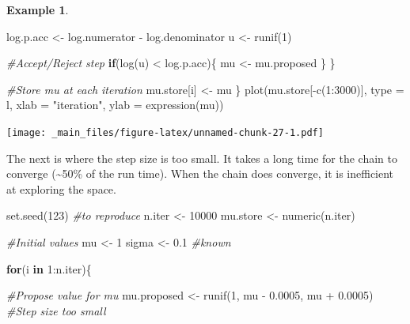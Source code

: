 \documentclass[
]{book}
\newenvironment{Shaded}{\begin{snugshade}}{\end{snugshade}}
\newcommand{\AttributeTok}[1]{\textcolor[rgb]{0.77,0.63,0.00}{#1}}
\newcommand{\CommentTok}[1]{\textcolor[rgb]{0.56,0.35,0.01}{\textit{#1}}}
\newcommand{\ControlFlowTok}[1]{\textcolor[rgb]{0.13,0.29,0.53}{\textbf{#1}}}
\newcommand{\DecValTok}[1]{\textcolor[rgb]{0.00,0.00,0.81}{#1}}
\newcommand{\FloatTok}[1]{\textcolor[rgb]{0.00,0.00,0.81}{#1}}
\newcommand{\FunctionTok}[1]{\textcolor[rgb]{0.00,0.00,0.00}{#1}}
\newcommand{\NormalTok}[1]{#1}
\newcommand{\OtherTok}[1]{\textcolor[rgb]{0.56,0.35,0.01}{#1}}
\newcommand{\SpecialCharTok}[1]{\textcolor[rgb]{0.00,0.00,0.00}{#1}}
\newcommand{\StringTok}[1]{\textcolor[rgb]{0.31,0.60,0.02}{#1}}
\theoremstyle{definition}
\theoremstyle{definition}
\newtheorem{example}{Example}[chapter]
\theoremstyle{definition}
\theoremstyle{definition}
\theoremstyle{remark}
\begin{document}
\begin{example}
\begin{Shaded}
\begin{Highlighting}[]
\NormalTok{    log.p.acc }\OtherTok{\textless{}{-}}\NormalTok{ log.numerator }\SpecialCharTok{{-}}\NormalTok{ log.denominator}
\NormalTok{    u }\OtherTok{\textless{}{-}} \FunctionTok{runif}\NormalTok{(}\DecValTok{1}\NormalTok{)}
    
    \CommentTok{\#Accept/Reject step}
    \ControlFlowTok{if}\NormalTok{(}\FunctionTok{log}\NormalTok{(u) }\SpecialCharTok{\textless{}}\NormalTok{ log.p.acc)\{}
\NormalTok{      mu }\OtherTok{\textless{}{-}}\NormalTok{ mu.proposed}
\NormalTok{    \}}
\NormalTok{  \}}
  
  \CommentTok{\#Store mu at each iteration}
\NormalTok{  mu.store[i] }\OtherTok{\textless{}{-}}\NormalTok{ mu}
\NormalTok{\}}
\FunctionTok{plot}\NormalTok{(mu.store[}\SpecialCharTok{{-}}\FunctionTok{c}\NormalTok{(}\DecValTok{1}\SpecialCharTok{:}\DecValTok{3000}\NormalTok{)], }\AttributeTok{type =} \StringTok{\textquotesingle{}l\textquotesingle{}}\NormalTok{, }\AttributeTok{xlab =} \StringTok{"iteration"}\NormalTok{, }\AttributeTok{ylab =} \FunctionTok{expression}\NormalTok{(mu))}
\end{Highlighting}
\end{Shaded}

\texttt{[image: \_main\_files/figure-latex/unnamed-chunk-27-1.pdf]}

The next is where the step size is too small. It takes a long time for the chain to converge (\textasciitilde50\% of the run time). When the chain does converge, it is inefficient at exploring the space.

\begin{Shaded}
\begin{Highlighting}[]
\FunctionTok{set.seed}\NormalTok{(}\DecValTok{123}\NormalTok{) }\CommentTok{\#to reproduce}
\NormalTok{n.iter   }\OtherTok{\textless{}{-}} \DecValTok{10000}
\NormalTok{mu.store }\OtherTok{\textless{}{-}} \FunctionTok{numeric}\NormalTok{(n.iter)}

\CommentTok{\#Initial values}
\NormalTok{mu }\OtherTok{\textless{}{-}} \DecValTok{1} 
\NormalTok{sigma }\OtherTok{\textless{}{-}} \FloatTok{0.1} \CommentTok{\#known}

\ControlFlowTok{for}\NormalTok{(i }\ControlFlowTok{in} \DecValTok{1}\SpecialCharTok{:}\NormalTok{n.iter)\{}
  
  \CommentTok{\#Propose value for mu}
\NormalTok{  mu.proposed }\OtherTok{\textless{}{-}} \FunctionTok{runif}\NormalTok{(}\DecValTok{1}\NormalTok{, mu }\SpecialCharTok{{-}} \FloatTok{0.0005}\NormalTok{, mu }\SpecialCharTok{+} \FloatTok{0.0005}\NormalTok{) }\CommentTok{\#Step size too small}
  

\end{Highlighting}
\end{Shaded}
\end{example}
\end{document}

